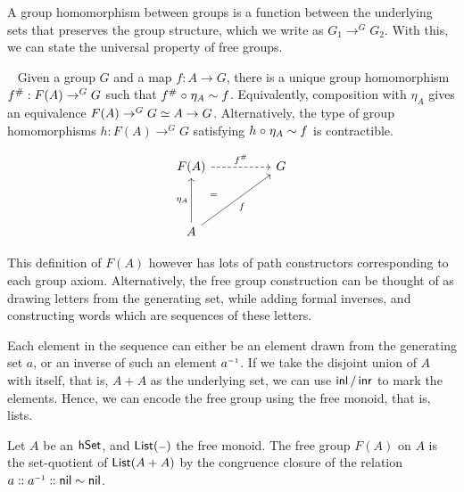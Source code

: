 A group homomorphism between groups is a function between the underlying sets
that preserves the group structure, which we write as $G_1 \to^G G_2$. With
this, we can state the universal property of free groups.

\begin{proposition}~\label{prop:free-groups}
  Given a group $G$ and a map $f : A \to G$, there is a unique group
  homomorphism ${f}^\# : F(A) \to^G G$ such that ${f}^\# \mathrel{\circ} \eta_A
    \mathrel{\sim} f$. Equivalently, composition with $\eta_A$ gives an equivalence $F(A)
    \to^G G \mathrel{\simeq} A \to G$. Alternatively, the type of group homomorphisms $h :
    F(A) \to^G G$ satisfying $h \mathrel{\circ} \eta_A \mathrel{\sim} f$ is contractible.

  \[\begin{tikzcd}
      {F(A)} && G \\
      \\
      A
      \arrow[""{name=0, anchor=center, inner sep=0}, "{\eta_A}", from=3-1, to=1-1]
      \arrow[""{name=1, anchor=center, inner sep=0}, "f"', from=3-1, to=1-3]
      \arrow["{\extend{f}}", dashed, from=1-1, to=1-3]
      \arrow["\id", Rightarrow, draw=none, from=0, to=1]
    \end{tikzcd}\]
\end{proposition}

This definition of $F(A)$ however has lots of path constructors corresponding to
each group axiom. Alternatively, the free group construction can be thought of
as drawing letters from the generating set, while adding formal inverses, and
constructing words which are sequences of these letters.

Each element in the sequence can either be an element drawn from the generating
set $a$, or an inverse of such an element $\inv{a}$. If we take the disjoint
union of $A$ with itself, that is, $A + A$ as the underlying set, we can use
$\operatorname{\mathsf{inl}}/\operatorname{\mathsf{inr}}$ to mark the elements. Hence, we can encode the free group using the
free monoid, that is, lists.

\begin{definition}
  Let $A$ be an $\mathsf{hSet}$, and $\List[\blank]$ the free monoid. The free group
  $F(A)$ on $A$ is the set-quotient of $\List[A + A]$ by the congruence closure
  of the relation $a \cons \inv{a} \cons \nil \sim \nil$.
\end{definition}

